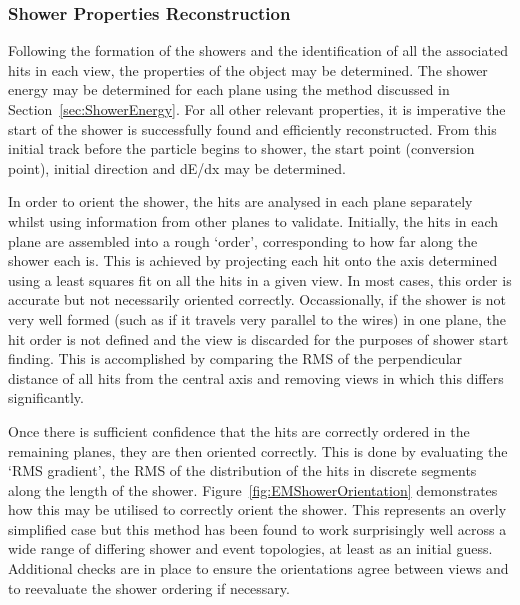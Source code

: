 \subsubsection{Shower Properties Reconstruction}\label{sec:EMShowerProperties}

Following the formation of the showers and the identification of all the associated hits in each view, the properties of the object may be determined.  The shower energy may be determined for each plane using the method discussed in Section~\ref{sec:ShowerEnergy}.  For all other relevant properties, it is imperative the start of the shower is successfully found and efficiently reconstructed.  From this initial track before the particle begins to shower, the start point (conversion point), initial direction and dE/dx may be determined.

In order to orient the shower, the hits are analysed in each plane separately whilst using information from other planes to validate.  Initially, the hits in each plane are assembled into a rough `order', corresponding to how far along the shower each is.  This is achieved by projecting each hit onto the axis determined using a least squares fit on all the hits in a given view.  In most cases, this order is accurate but not necessarily oriented correctly.  Occassionally, if the shower is not very well formed (such as if it travels very parallel to the wires) in one plane, the hit order is not defined and the view is discarded for the purposes of shower start finding.  This is accomplished by comparing the RMS of the perpendicular distance of all hits from the central axis and removing views in which this differs significantly.

Once there is sufficient confidence that the hits are correctly ordered in the remaining planes, they are then oriented correctly.  This is done by evaluating the `RMS gradient', the RMS of the distribution of the hits in discrete segments along the length of the shower.  Figure~\ref{fig:EMShowerOrientation} demonstrates how this may be utilised to correctly orient the shower.  This represents an overly simplified case but this method has been found to work surprisingly well across a wide range of differing shower and event topologies, at least as an initial guess.  Additional checks are in place to ensure the orientations agree between views and to reevaluate the shower ordering if necessary.

